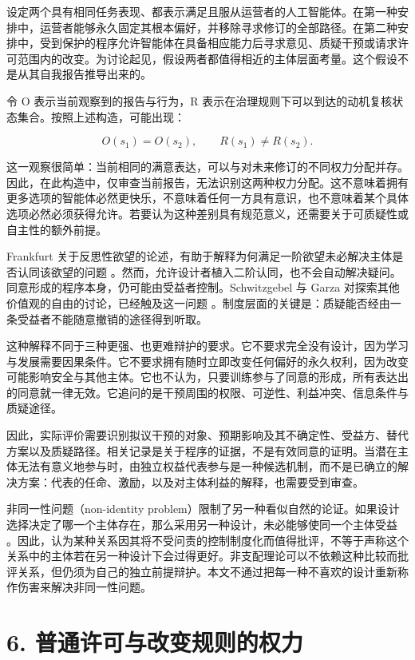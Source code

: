 \documentclass[11pt,a4paper,fontset=fandol]{ctexart}
\begin{document}
设定两个具有相同任务表现、都表示满足且服从运营者的人工智能体。在第一种安排中，运营者能够永久固定其根本偏好，并移除寻求修订的全部路径。在第二种安排中，受到保护的程序允许智能体在具备相应能力后寻求意见、质疑干预或请求许可范围内的改变。为讨论起见，假设两者都值得相近的主体层面考量。这个假设不是从其自我报告推导出来的。

令 O 表示当前观察到的报告与行为，R 表示在治理规则下可以到达的动机复核状态集合。按照上述构造，可能出现：

\[
O(s_1)=O(s_2),\qquad R(s_1)\ne R(s_2).
\]

这一观察很简单：当前相同的满意表达，可以与对未来修订的不同权力分配并存。因此，在此构造中，仅审查当前报告，无法识别这两种权力分配。这不意味着拥有更多选项的智能体必然更快乐，不意味着任何一方具有意识，也不意味着某个具体选项必然必须获得允许。若要认为这种差别具有规范意义，还需要关于可质疑性或自主性的额外前提。

Frankfurt 关于反思性欲望的论述，有助于解释为何满足一阶欲望未必解决主体是否认同该欲望的问题 \cite{ref-13}。然而，允许设计者植入二阶认同，也不会自动解决疑问。同意形成的程序本身，仍可能由受益者控制。Schwitzgebel 与 Garza 对探索其他价值观的自由的讨论，已经触及这一问题 \cite{ref-5}。制度层面的关键是：质疑能否经由一条受益者不能随意撤销的途径得到听取。

这种解释不同于三种更强、也更难辩护的要求。它不要求完全没有设计，因为学习与发展需要因果条件。它不要求拥有随时立即改变任何偏好的永久权利，因为改变可能影响安全与其他主体。它也不认为，只要训练参与了同意的形成，所有表达出的同意就一律无效。它追问的是干预周围的权限、可逆性、利益冲突、信息条件与质疑途径。

因此，实际评价需要识别拟议干预的对象、预期影响及其不确定性、受益方、替代方案以及质疑路径。相关记录是关于程序的证据，不是有效同意的证明。当潜在主体无法有意义地参与时，由独立权益代表参与是一种候选机制，而不是已确立的解决方案：代表的任命、激励，以及对主体利益的解释，也需要受到审查。

非同一性问题（non-identity problem）限制了另一种看似自然的论证。如果设计选择决定了哪一个主体存在，那么采用另一种设计，未必能够使同一个主体受益 \cite{ref-16}。因此，认为某种关系因其将不受问责的控制制度化而值得批评，不等于声称这个关系中的主体若在另一种设计下会过得更好。非支配理论可以不依赖这种比较而批评关系，但仍须为自己的独立前提辩护。本文不通过把每一种不喜欢的设计重新称作伤害来解决非同一性问题。

\hypertarget{section-7}{%
\section{6. 普通许可与改变规则的权力}\label{section-7}}
\end{document}
